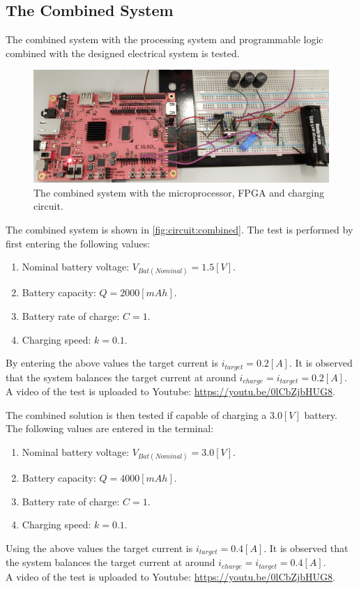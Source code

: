 \documentclass[../report.tex]{subfiles}
\begin{document}
\subsection{The Combined System}
The combined system with the processing system and programmable logic combined with the designed electrical system is tested.
\begin{figure}[H]
    \centering
         \includegraphics[width=1\textwidth]{figures/circuit/combined_triple.jpg}
     \caption{The combined system with the microprocessor, FPGA and charging circuit.}
     \label{fig:circuit:combined}
\end{figure}
The combined system is shown in \autoref{fig:circuit:combined}. The test is performed by first entering the following values:
\begin{enumerate}
    \item Nominal battery voltage: $V_{Bat(Nominal)} = 1.5 [V]$.
    \item Battery capacity: $Q = 2000 [mAh]$.
    \item Battery rate of charge: $C = 1$.
    \item Charging speed: $ k = 0.1$.
\end{enumerate}
By entering the above values the target current is $i_{target} = 0.2 [A]$. It is observed that the system balances the target current at around $i_{charge} = i_{target} = 0.2 [A]$.\\
A video of the test is uploaded to Youtube: \url{https://youtu.be/0lCbZjbHUG8}.

The combined solution is then tested if capable of charging a $3.0 [V]$ battery. The following values are entered in the terminal:
\begin{enumerate}
    \item Nominal battery voltage: $V_{Bat(Nominal)} = 3.0 [V]$.
    \item Battery capacity: $Q = 4000 [mAh]$.
    \item Battery rate of charge: $C = 1$.
    \item Charging speed: $ k = 0.1$.
\end{enumerate}
Using the above values the target current is  $i_{target} = 0.4 [A]$. It is observed that the system balances the target current at around $i_{charge} = i_{target} = 0.4 [A]$.\\
A video of the test is uploaded to Youtube: \url{https://youtu.be/0lCbZjbHUG8}.
\end{document}
